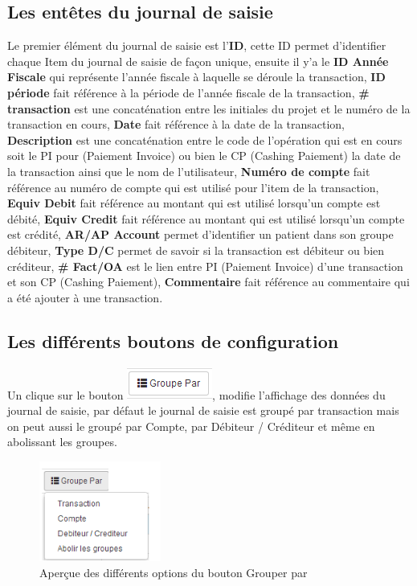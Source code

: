 \documentclass[12pt,a4paper]{report}
\begin{document}
\subsection{Les entêtes du journal de saisie}
Le premier élément du journal de saisie est l'\textbf{ID}, cette ID permet d'identifier chaque Item du journal de saisie de façon unique, ensuite il y'a le \textbf{ID Année Fiscale} qui représente l'année fiscale à laquelle se déroule la transaction,  \textbf{ID période} fait référence à la période de l'année fiscale de la transaction, \textbf{\# transaction} est une concaténation entre les initiales du projet et le numéro de la transaction en cours, \textbf{Date} fait référence à la date de la transaction, \textbf{Description} est une concaténation entre le code de l'opération qui est en cours soit le PI pour (Paiement Invoice) ou bien le CP (Cashing Paiement) la date de la transaction ainsi que le nom de l'utilisateur, \textbf{Numéro de compte} fait référence au numéro de compte qui est utilisé pour l'item de la transaction, \textbf{Equiv Debit} fait référence au montant qui est utilisé lorsqu'un compte est débité,\textbf{ Equiv Credit} fait référence au montant qui est utilisé lorsqu'un compte est crédité, \textbf{AR/AP Account} permet d'identifier un patient dans son groupe débiteur, \textbf{Type D/C }permet de savoir si la transaction est débiteur ou bien créditeur, \textbf{\# Fact/OA }est le lien entre PI (Paiement Invoice) d'une transaction et son CP (Cashing Paiement), \textbf{Commentaire} fait référence au commentaire qui a été ajouter à une transaction.

\subsection{Les différents boutons de configuration}

Un clique sur le bouton 
\includegraphics[scale=0.7]{pic/GroupePar.png}, modifie l'affichage des données du journal de saisie, par défaut le journal de saisie est groupé par transaction mais on peut aussi le groupé par Compte, par Débiteur / Créditeur et même en abolissant les groupes.

\begin{figure}[h]
\begin{center}
\includegraphics[width=4cm]{pic/GroupeParAction.png}
\end{center}
\caption{Aperçue des différents options du bouton Grouper par}
\label{Aperçue des différents options du bouton Grouper par}
\end{figure}
\end{document}

